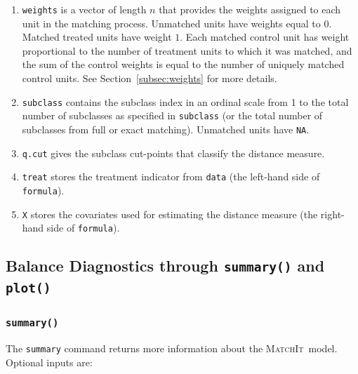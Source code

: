 \documentclass[oneside,letterpaper,titlepage]{article}
\newcommand{\MatchIt}{\textsc{MatchIt}}
\begin{document}
\begin{enumerate}
\item \texttt{weights} is a vector of length $n$ that provides the
  weights assigned to each unit in the matching process.  Unmatched
  units have weights equal to $0$. Matched treated units have weight
  $1$.  Each matched control unit has weight proportional to the
  number of treatment units to which it was matched, and the sum of
  the control weights is equal to the number of uniquely matched
  control units. See Section~\ref{subsec:weights} for more details.
  
\item \texttt{subclass} contains the subclass index in an ordinal
  scale from 1 to the total number of subclasses as specified in
  \texttt{subclass} (or the total number of subclasses from full or
  exact matching).  Unmatched units have \texttt{NA}.
  
\item \texttt{q.cut} gives the subclass cut-points that classify the
  distance measure.
  
\item \texttt{treat} stores the treatment indicator from
  \texttt{data} (the left-hand side of \texttt{formula}).
 
\item \texttt{X} stores the covariates used for estimating the
  distance measure (the right-hand side of \texttt{formula}).
\end{enumerate}


%

\subsection{Balance Diagnostics through {\tt summary()} and {\tt plot()}}
\label{cmd:sum}

\subsubsection{{\tt summary()}}
The \texttt{summary} command returns more information about the
\MatchIt\ model.  Optional inputs are:
\end{document}
